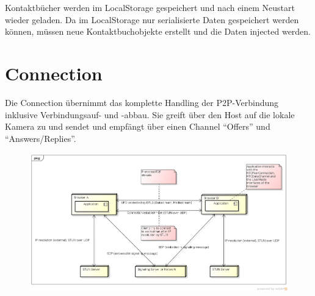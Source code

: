 	Kontaktbücher werden im LocalStorage gespeichert und nach einem Neustart wieder
	geladen. Da im LocalStorage nur serialisierte Daten gespeichert werden können,
	müssen neue Kontaktbuchobjekte erstellt und die Daten injected werden.


\section{Connection}
	Die Connection übernimmt das komplette Handling der P2P-Verbindung inklusive Verbindungsauf- und -abbau. Sie greift über den Host auf die lokale Kamera zu und sendet und empfängt über einen Channel "`Offers"' und "`Answers/Replies"'.
	\begin{figure}[H]
		\centering
		\includegraphics[width=\textwidth]{../architekturanalayse/img/connection.png}
	\end{figure}
		
